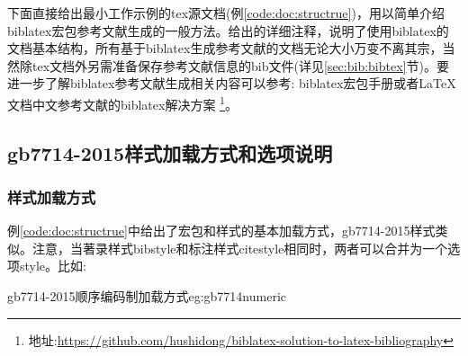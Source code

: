 
下面直接给出最小工作示例的tex源文档(例\ref{code:doc:structrue})，用以简单介绍biblatex宏包参考文献生成的一般方法。给出的详细注释，说明了使用biblatex的文档基本结构，所有基于biblatex生成参考文献的文档无论大小万变不离其宗，当然除tex文档外另需准备保存参考文献信息的bib文件(详见\ref{sec:bib:bibtex}节)。要进一步了解biblatex参考文献生成相关内容可以参考: biblatex宏包手册或者LaTeX 文档中文参考文献的biblatex解决方案
\footnote{地址:\url{https://github.com/hushidong/biblatex-solution-to-latex-bibliography}}。



\subsection{gb7714-2015样式加载方式和选项说明}
\subsubsection{样式加载方式}
例\ref{code:doc:structrue}中给出了宏包和样式的基本加载方式，gb7714-2015样式类似。注意，当著录样式bibstyle和标注样式citestyle相同时，两者可以合并为一个选项style。比如:

\begin{codetex}{gb7714-2015顺序编码制加载方式}{eg:gb7714numeric}
\usepackage[backend=biber,bibstyle=gb7714-2015,citestyle=gb7714-2015]{biblatex}
\usepackage[backend=biber,style=gb7714-2015,gbalign=left,gbpub=true]{biblatex}
\end{codetex}

